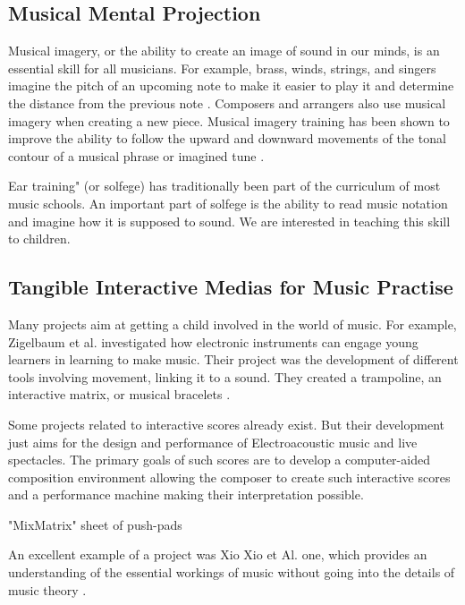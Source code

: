 \subsection{Musical Mental Projection}

Musical imagery, or the ability to create an image of sound in our minds, is an essential
skill for all musicians. For example, brass, winds, strings, and singers imagine the
pitch of an upcoming note to make it easier to play it and determine the distance from
the previous note
\cite{zatorre2005mental}. Composers and arrangers also use musical imagery when creating
a new piece. Musical imagery training has been shown to improve the ability to follow
the upward and downward movements of the tonal contour of a musical phrase or
imagined tune
\cite{weber1986musical}.

Ear training" (or solfege) has traditionally been part of the curriculum of most music
schools. An important part of solfege is the ability to read music notation and imagine
how it is supposed to sound. We are interested in teaching this skill to children.


\subsection{Tangible Interactive Medias for Music Practise}


Many projects aim at getting a child involved in the world of music. For example, Zigelbaum et al. investigated how electronic instruments can engage young learners in learning to make music. Their project was the development of different tools involving movement, linking it to a sound. They created a trampoline, an interactive matrix, or musical bracelets \cite{zigelbaum2006bodybeats}.

Some projects related to interactive scores already exist. But their development just aims for the design and performance of Electroacoustic music \cite{struc_inter_music_score} and live spectacles. The primary goals of such scores are to develop a computer-aided composition environment allowing the composer to create such interactive scores and a performance machine making their interpretation possible.

"MixMatrix" sheet of push-pads

An excellent example of a project was Xio Xio et Al. one, which provides an understanding of the essential workings of music without going into the details of music theory \cite{xiao2014andante}.

